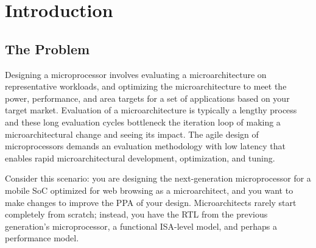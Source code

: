 \documentclass[sigplan,review,nonacm,10pt]{acmart}
\begin{document}

\maketitle

\section{Introduction}


\subsection{The Problem}

Designing a microprocessor involves evaluating a microarchitecture on representative workloads, and optimizing the microarchitecture to meet the power, performance, and area targets for a set of applications based on your target market.
Evaluation of a microarchitecture is typically a lengthy process and these long evaluation cycles bottleneck the iteration loop of making a microarchitectural change and seeing its impact.
The agile design of microprocessors demands an evaluation methodology with low latency that enables rapid microarchitectural development, optimization, and tuning.

Consider this scenario: you are designing the next-generation microprocessor for a mobile SoC optimized for web browsing as a microarchitect, and you want to make changes to improve the PPA of your design.
Microarchitects rarely start completely from scratch; instead, you have the RTL from the previous generation's microprocessor, a functional ISA-level model, and perhaps a performance model.
\end{document}
